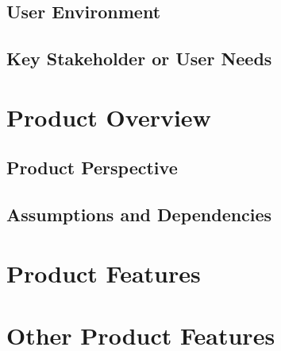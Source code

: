 \documentclass[a4paper]{article}
\begin{document}
\bigskip
\subsection{User Environment}



\bigskip
\subsection{Key Stakeholder or User Needs}



\bigskip
\section{Product Overview}
\subsection{Product Perspective}


\bigskip
\subsection{Assumptions and Dependencies}



\bigskip
\section{Product Features}



\bigskip
\section{Other Product Features}
\end{document}
